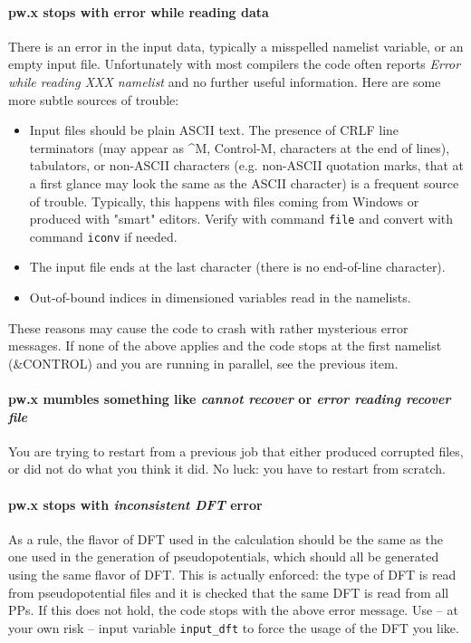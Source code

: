 \documentclass[12pt,a4paper]{article}
\begin{document}
\paragraph{pw.x stops with error while reading data}
There is an error in the input data, typically a misspelled namelist 
variable, or an empty input file.
Unfortunately with most compilers the code often reports {\em Error while
reading XXX namelist} and no further useful information.
Here are some more subtle sources of trouble:
\begin{itemize}
\item Input files should be plain ASCII text. The presence of CRLF line
  terminators (may appear as \^{}M, Control-M, characters at the end
  of lines), tabulators, or non-ASCII characters (e.g. non-ASCII
  quotation marks, that at a first glance may look the same as
  the ASCII character) is a frequent source of trouble.
  Typically, this happens with files coming from Windows or produced
  with "smart" editors. Verify with command \texttt{file} and convert
  with command \texttt{iconv} if needed.
\item The input file ends at the last character (there is no end-of-line
  character).
\item Out-of-bound indices in dimensioned variables read in the namelists.
\end{itemize}
These reasons may cause the code to crash with rather mysterious error messages.
If none of the above applies and the code stops at the first namelist
(\&CONTROL) and you are running in parallel, see the previous item.

\paragraph{pw.x mumbles something like {\em cannot recover} or 
{\em error reading recover file}} 
You are trying to restart from a previous job that either
produced corrupted files, or did not do what you think it did. No luck: you
have to restart from scratch.

\paragraph{pw.x stops with {\em inconsistent DFT} error}
As a rule, the flavor of DFT used in the calculation should be the
same as the one used in the generation of pseudopotentials, which
should all be generated using the same flavor of DFT. This is actually enforced: the
type of DFT is read from pseudopotential files and it is checked that the same DFT
is read from all PPs. If this does not hold, the code stops with the
above error message. Use -- at your own risk -- input variable 
\texttt{input\_dft} to force the usage of the DFT you like.
\end{document}
